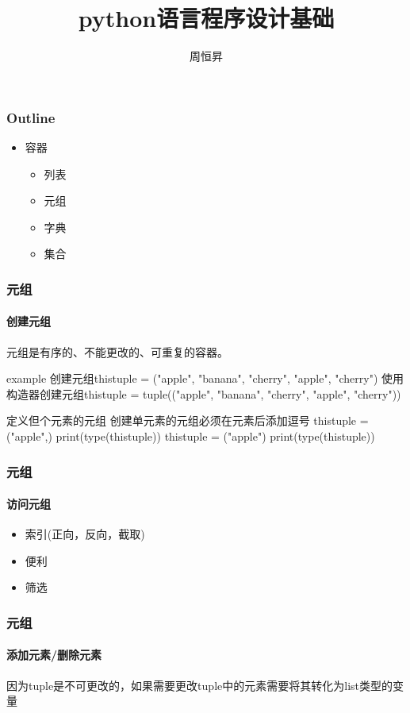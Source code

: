 \documentclass{beamer}
\title{python语言程序设计基础}
\author{周恒昇}
\institute{西亚斯学院}
\begin{document}
\begin{frame}
	\frametitle{Outline}
	\begin{itemize}
		\item  容器
		      \begin{itemize}
			      \item 列表
			      \item 元组
			      \item 字典
			      \item 集合
		      \end{itemize}
	\end{itemize}
\end{frame}
\begin{frame}
	\frametitle{元组}
	\framesubtitle{创建元组}
	元组是有序的、不能更改的、可重复的容器。
	\begin{block}{example}
		创建元组thistuple = ("apple", "banana", "cherry", "apple", "cherry")
		使用构造器创建元组thistuple = tuple(("apple", "banana", "cherry", "apple", "cherry"))
	\end{block}
	\begin{alertblock}{定义但个元素的元组}
		创建单元素的元组必须在元素后添加逗号
		thistuple = ("apple",)
		print(type(thistuple))
		thistuple = ("apple")
		print(type(thistuple))
	\end{alertblock}

\end{frame}
\begin{frame}
	\frametitle{元组}
	\framesubtitle{访问元组}
	\begin{itemize}
		\item 索引(正向，反向，截取)
		\item 便利
		\item 筛选
	\end{itemize}
\end{frame}

\begin{frame}
	\frametitle{元组}
	\framesubtitle{添加元素/删除元素}
	因为tuple是不可更改的，如果需要更改tuple中的元素需要将其转化为list类型的变量

\end{frame}
\end{document}
